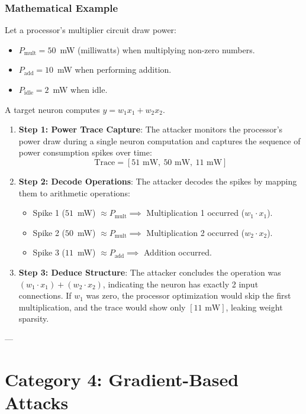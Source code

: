 \documentclass{article}
\begin{document}
\subsubsection{Mathematical Example}
Let a processor's multiplier circuit draw power:
\begin{itemize}
    \item $P_{\text{mult}} = 50$~mW (milliwatts) when multiplying non-zero numbers.
    \item $P_{\text{add}} = 10$~mW when performing addition.
    \item $P_{\text{idle}} = 2$~mW when idle.
\end{itemize}
A target neuron computes $y = w_1 x_1 + w_2 x_2$.
\begin{enumerate}
    \item \textbf{Step 1: Power Trace Capture}: The attacker monitors the processor's power draw during a single neuron computation and captures the sequence of power consumption spikes over time:
    $$\text{Trace} = [51\text{ mW}, \ 50\text{ mW}, \ 11\text{ mW}]$$
    
    \item \textbf{Step 2: Decode Operations}: The attacker decodes the spikes by mapping them to arithmetic operations:
    \begin{itemize}
        \item Spike 1 ($51$~mW) $\approx P_{\text{mult}} \implies$ Multiplication 1 occurred ($w_1 \cdot x_1$).
        \item Spike 2 ($50$~mW) $\approx P_{\text{mult}} \implies$ Multiplication 2 occurred ($w_2 \cdot x_2$).
        \item Spike 3 ($11$~mW) $\approx P_{\text{add}} \implies$ Addition occurred.
    \end{itemize}
    
    \item \textbf{Step 3: Deduce Structure}: The attacker concludes the operation was $(w_1 \cdot x_1) + (w_2 \cdot x_2)$, indicating the neuron has exactly 2 input connections. If $w_1$ was zero, the processor optimization would skip the first multiplication, and the trace would show only $[11\text{ mW}]$, leaking weight sparsity.
\end{enumerate}

---

\section{Category 4: Gradient-Based Attacks}
\end{document}
